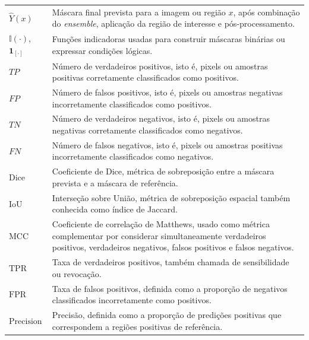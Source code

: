 \begin{longtable}{p{3.0cm}p{12.0cm}}
  $\hat{Y}(x)$ &
  Máscara final prevista para a imagem ou região $x$, após combinação do
  \textit{ensemble}, aplicação da região de interesse e pós-processamento.\\

  $\mathbb{I}(\cdot)$, $\mathbf{1}_{[\cdot]}$ &
  Funções indicadoras usadas para construir máscaras binárias ou expressar
  condições lógicas.\\

  $TP$ &
  Número de verdadeiros positivos, isto é, pixels ou amostras positivas
  corretamente classificados como positivos.\\

  $FP$ &
  Número de falsos positivos, isto é, pixels ou amostras negativas
  incorretamente classificados como positivos.\\

  $TN$ &
  Número de verdadeiros negativos, isto é, pixels ou amostras negativas
  corretamente classificados como negativos.\\

  $FN$ &
  Número de falsos negativos, isto é, pixels ou amostras positivas
  incorretamente classificados como negativos.\\

  $\mathrm{Dice}$ &
  Coeficiente de Dice, métrica de sobreposição entre a máscara prevista e a
  máscara de referência.\\

  $\mathrm{IoU}$ &
  Interseção sobre União, métrica de sobreposição espacial também conhecida como
  índice de Jaccard.\\

  $\mathrm{MCC}$ &
  Coeficiente de correlação de Matthews, usado como métrica complementar por
  considerar simultaneamente verdadeiros positivos, verdadeiros negativos,
  falsos positivos e falsos negativos.\\

  $\mathrm{TPR}$ &
  Taxa de verdadeiros positivos, também chamada de sensibilidade ou revocação.\\

  $\mathrm{FPR}$ &
  Taxa de falsos positivos, definida como a proporção de negativos classificados
  incorretamente como positivos.\\

  $\mathrm{Precision}$ &
  Precisão, definida como a proporção de predições positivas que correspondem a
  regiões positivas de referência.\\


\end{longtable}
